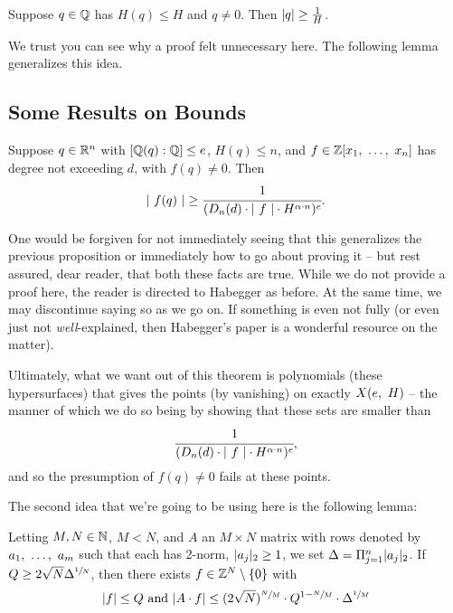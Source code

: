 \begin{proposition}
  Suppose $q \in \Q$ has $H(q) \leq H$ and $q \neq 0$. Then $\norm{q} \geq \frac{1}{H}$.
\end{proposition}

We trust you can see why a proof felt unnecessary here. The following lemma generalizes this idea.

\subsection{Some Results on Bounds}

\begin{lemma}
  Suppose $q \in \R^n$ with $[\Q(q) : \Q] \leq e$, $H(q) \leq n$, and $f \in \Z[x_1, \ \hdots, \ x_n]$ has degree not exceeding $d$, with $f(q) \neq 0$. Then
    \begin{align*}
      \lvrv{f(q)} \geq \cfrac{1}{(D_n(d) \cdot \lvrv{f} \cdot H^{\alpha \cdot n})^e}.
    \end{align*}
\end{lemma}

One would be forgiven for not immediately seeing that this generalizes the previous proposition or immediately how to go about proving it -- but rest assured, dear reader, that both these facts are true. While we do not provide a proof here, the reader is directed to Habegger \cite{habegger_diophantine_2016} as before. At the same time, we may discontinue saying so as we go on. If something is even not fully (or even just not \emph{well}-explained, then Habegger's paper is a wonderful resource on the matter).

Ultimately, what we want out of this theorem is polynomials (these hypersurfaces) that gives the points (by vanishing) on exactly $\XeH[H]{e}$ -- the manner of which we do so being by showing that these sets are smaller than
  \begin{align*}
    \cfrac{1}{(D_n(d) \cdot \lvrv{f} \cdot H^{\alpha \cdot n})^e},
  \end{align*}
and so the presumption of $f(q) \neq 0$ fails at these points.

The second idea that we're going to be using here is the following lemma:
\begin{lemma}
  Letting $M, N \in \N$, $M < N$, and $A$ an $M \times N$ matrix with rows denoted by $\vonevm{a}{m}$ such that each has 2-norm, $\twonorm{a_j} \geq 1$, we set $\Delta = \Pi_{j=1}^{n} \twonorm{a_j}$. If $Q \geq 2 \sqrt{N} \Delta^{\sfrac{1}{N}}$, then there exists $f \in \Z^N \setminus \zeroset$ with
    \begin{align*}
      \norm{f} \leq Q \textrm{ and } \norm{A \cdot f} \leq (2 \sqrt{N})^{\sfrac{N}{M}} \cdot Q^{1 - \sfrac{N}{M}} \cdot \Delta^{\sfrac{1}{M}}
    \end{align*}
\end{lemma}

